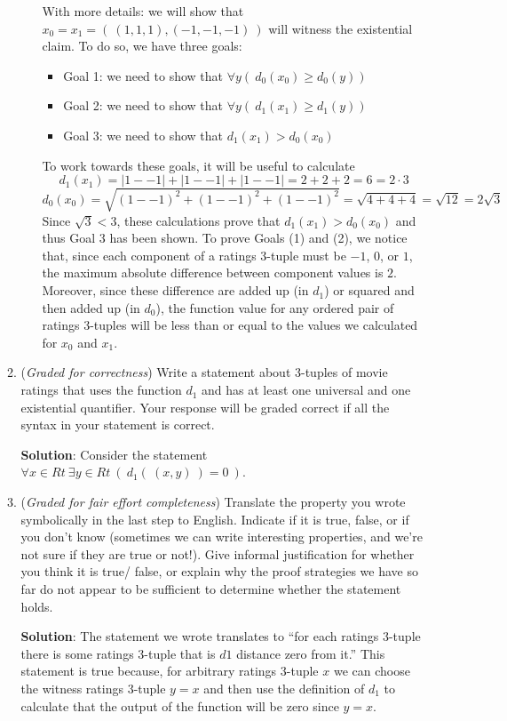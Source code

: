 \begin{enumerate}
\begin{enumerate}
\begin{enumerate}
            With more details: 
            we will show that $x_0 = x_1 = (~(1,1,1), (-1,-1,-1)~)$ will witness the existential claim.
            To do so, we have three goals:
            \begin{itemize}
              \item Goal 1: we need to show that $\forall y (~d_0(x_0) \geq d_0(y))$
              \item Goal 2: we need to show that $\forall y (~d_1(x_1) \geq d_1(y))$
              \item Goal 3: we need to show that $d_1(x_1) > d_0 (x_0)$
            \end{itemize}
            To work towards these goals, it will be useful to calculate 
            \[
              d_1(x_1) = |1--1| + |1--1| + |1--1| = 2 + 2 + 2 = 6 = 2 \cdot 3
            \]
            \[
              d_0(x_0) = \sqrt{(1--1)^2 + (1--1)^2 + (1--1)^2} = \sqrt{4 + 4+ 4} = \sqrt{12} = 2\sqrt{3}
            \]
            Since $\sqrt{3} < 3$, these calculations prove that $d_1(x_1) > d_0 (x_0)$ and thus Goal 3 has been shown.
            To prove Goals (1) and (2), we notice that, since each component of a ratings 3-tuple must be 
            $-1$, $0$, or $1$, the maximum absolute difference between component values is $2$. Moreover, since these
            difference are added up (in $d_1$) or squared and then added up (in $d_0$), the function value for any ordered
            pair of ratings $3$-tuples will be less than or equal to the values we calculated for $x_0$ and $x_1$. 
        \end{enumerate}

    \item ({\it Graded for correctness}) Write a statement about 3-tuples of movie ratings that uses the function 
    $d_1$ and has at least one universal and one existential quantifier. Your response will be 
    graded correct if all the syntax in your statement is correct.

    {\bf Solution}: Consider the statement $\forall x \in Rt ~\exists y \in Rt ~(~d_1(~(x,y)~) = 0~)$. 

    \item ({\it Graded for fair effort completeness}) Translate the property you wrote symbolically in the 
    last step to English. Indicate if it is true, false, or if you don't know 
    (sometimes we can write interesting properties, and we're not sure if they are true or not!). 
    Give informal justification for whether  you think it is true/ false, or explain why 
    the proof strategies we have so far do not appear to  be sufficient to determine whether the statement holds.

    {\bf Solution}: The statement we wrote translates to ``for each ratings 3-tuple there is some ratings 3-tuple 
    that is $d1$ distance zero from it.'' This statement is true because, for arbitrary ratings 3-tuple $x$
    we can choose the witness ratings 3-tuple $y=x$ and then use the definition of $d_1$ to calculate that the 
    output of the function will be zero since $y=x$.
    \end{enumerate}

\end{enumerate}
